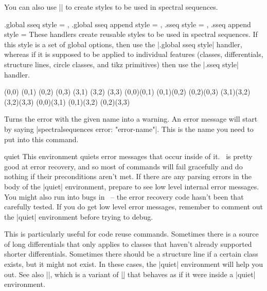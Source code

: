 \begin{sseqdata}[name = basic, cohomological Serre grading]
\begin{command}{\sseqset{}}
You can also use |\sseqset| to create styles to be used in spectral sequences.
\begin{keylist}{
    .global sseq style = ,
    .global sseq append style = ,
    .sseq style = ,
    .sseq append style = 
}
These handlers create reusable styles to be used in spectral sequences. If this style is a set of global options, then use the |.global sseq style| handler, whereas if it is supposed to be applied to individual features (classes, differentials, structure lines, circle classes, and tikz primitives) then use the |.sseq style| handler.
\begin{codeexample}[width=6cm]
\begin{sseqpage}[ mysseq ]
\class(0,0) \class(0,1) \class(0,2) \class(0,3)
\class(3,1) \class(3,2) \class(3,3)
\structline(0,0)(0,1) \structline(0,1)(0,2)
\structline(0,2)(0,3)
\structline(3,1)(3,2) \structline(3,2)(3,3)
\structline[htwostruct](0,0)(3,1)
\structline[htwostruct](0,1)(3,2)
\structline[htwostruct](0,2)(3,3)
\end{sseqpage}
\end{codeexample}
\end{keylist}
\end{command}

\begin{command}{\SseqErrorToWarning{}}
Turns the error with the given name into a warning. An error message will start by saying \let\eatclnifpresent\empty|spectralsequences error: "error-name"|. This is the name you need to put into this command.
\end{command}

\begin{environment}{{quiet}}
This environment quiets error messages that occur inside of it. \sseqpages\ is pretty good at error recovery, and so most of commands will fail gracefully and do nothing if their preconditions aren't met. If there are any parsing errors in the body of the |{quiet}| environment, prepare to see low level internal error messages. You might also run into bugs in \sseqpages\ -- the error recovery code hasn't been that carefully tested. If you do get low level error messages, remember to comment out the |{quiet}| environment before trying to debug.

This is particularly useful for code reuse commands. Sometimes there is a source of long differentials that only applies to classes that haven't already supported shorter differentials. Sometimes there should be a structure line if a certain class exists, but it might not exist. In these cases, the |{quiet}| environment will help you out. See also |\DrawIfValidDifferential|, which is a variant of |\d| that behaves as if it were inside a |{quiet}| environment.
\end{environment}


\end{sseqdata}
